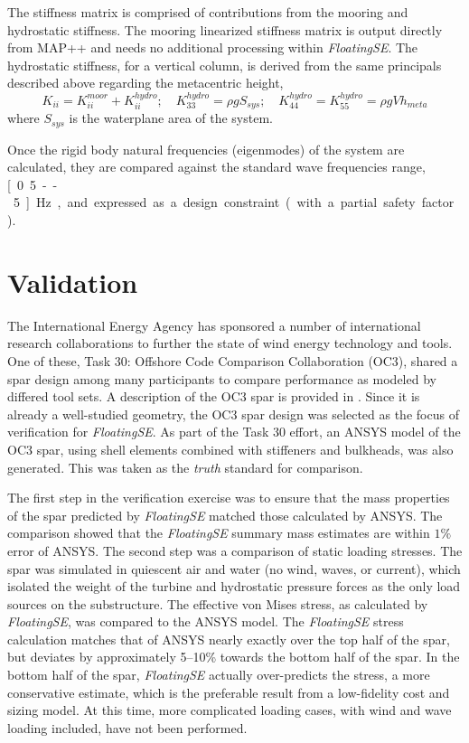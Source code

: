 The stiffness matrix is comprised of contributions from the mooring
and hydrostatic stiffness.  The mooring linearized stiffness matrix is output
directly from MAP++ and needs no additional processing within
\textit{FloatingSE}.  The hydrostatic stiffness, for a vertical column, is derived from the same
principals described above regarding the metacentric height,
\begin{equation}
  K_{ii} = K_{ii}^{moor} + K_{ii}^{hydro};\quad K_{33}^{hydro} = \rho g
  S_{sys};\quad K_{44}^{hydro} =  K_{55}^{hydro} = \rho g V h_{meta}
\end{equation}
where $S_{sys}$ is the waterplane area of the system.

Once the rigid body natural frequencies (eigenmodes) of the system are
calculated, they are compared against the standard wave frequencies
range, \unit[0.5--5]{Hz}, and expressed as a design constraint (with a
partial safety factor).


\section{Validation}
The International Energy Agency has sponsored a number of international
research collaborations to further the state of wind energy technology and
tools.  One of these, Task 30: Offshore Code Comparison Collaboration
(OC3), shared a spar design among many participants to compare
performance as modeled by differed tool sets.  A description of the OC3
spar is provided in \citet{OC3}.  Since it is already a
well-studied geometry, the OC3 spar design was selected as the focus of
verification for \textit{FloatingSE}.  As part of the Task 30 effort,
an ANSYS model of the OC3 spar, using shell elements combined with
stiffeners and bulkheads, was also generated.  This was taken as
the \textit{truth} standard for comparison.

The first step in the verification exercise was to ensure that the mass
properties of the spar predicted by \textit{FloatingSE} matched those
calculated by ANSYS.  The comparison showed that the \textit{FloatingSE}
summary mass estimates are within $1\%$ error of ANSYS.  The second step
was a comparison of static loading stresses.  The spar was simulated in
quiescent air and water (no wind, waves, or current), which isolated the
weight of the turbine and hydrostatic pressure forces as the only load
sources on the substructure.  The effective von Mises stress, as
calculated by \textit{FloatingSE}, was compared to the ANSYS model.  The
\textit{FloatingSE} stress calculation matches that of ANSYS nearly
exactly over the top half of the spar, but deviates by approximately
5--10\% towards the bottom half of the spar.  In the bottom half of the
spar, \textit{FloatingSE} actually over-predicts the stress, a more
conservative estimate, which is the preferable result from a
low-fidelity cost and sizing model.  At this time, more complicated
loading cases, with wind and wave loading included, have not been
performed.

